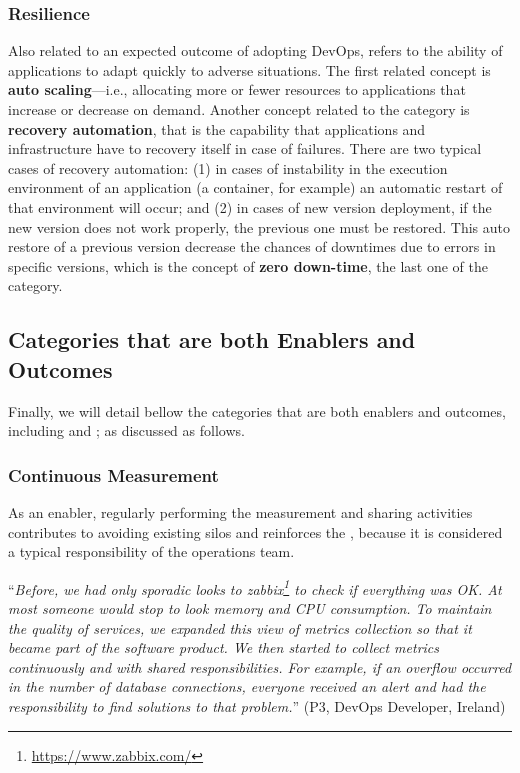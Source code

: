 \subsubsection{Resilience}

Also related to an expected outcome of adopting DevOps,  refers
to the ability of applications to adapt quickly to adverse situations.
The first related concept is \textbf{auto scaling}---i.e.,
allocating more or fewer resources to applications that increase or
decrease on demand. Another concept related to
the  category is \textbf{recovery automation}, that is
the capability that applications and infrastructure have to recovery itself in case of
failures. There are two typical cases of recovery automation: (1) in cases
of instability in the execution environment of an application (a
container, for example) an automatic restart of that environment will occur; and (2) in
cases of new version deployment, if the new version does not work properly, the
previous one must be restored. This auto restore of a previous version
decrease the chances of downtimes due to errors in specific versions, which
is the concept of \textbf{zero down-time}, the last one of the  category.

\subsection{Categories that are both Enablers and Outcomes}

Finally, we will detail bellow the categories that are both enablers
and outcomes, including 
and ; as discussed as follows.

\subsubsection{Continuous Measurement}

As an enabler, regularly performing the measurement and sharing activities
contributes to avoiding existing silos and reinforces the \cc, because it is
considered a typical responsibility of the operations team.

\begin{mq}
``\emph{Before, we had only sporadic looks to
zabbix\footnote{\url{https://www.zabbix.com/}} to check if everything was OK.
At most someone would stop to look memory and CPU consumption. To maintain
the quality of services, we expanded this view of metrics collection so that it
became part of the software product. We then started to collect metrics continuously
and with shared responsibilities. For example, if an overflow occurred in the
number of database connections, everyone received an alert and had
the responsibility to find solutions to that problem.}'' (P3, DevOps Developer, Ireland)
\end{mq}

